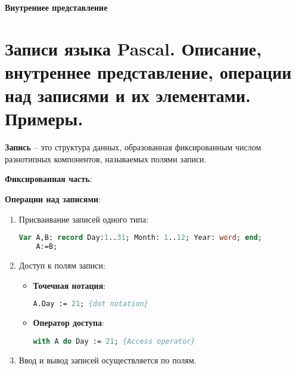{\bf{Внутреннее представление}}







\newpage\section{Записи языка Pascal. Описание, внутреннее представление, операции над записями и их 
элементами. Примеры. }

\begin{myquote}
            
\end{myquote}

{\bf{Запись}} – это структура данных, образованная фиксированным числом разнотипных компонентов, называемых полями записи.


{\bf{Фиксированная часть}}:


{\bf{Операции над записями}}:

\begin{enumerate}
\item Присваивание записей одного типа:

\begin{lstlisting}[language=Pascal]
	Var A,B: record Day:1..31; Month: 1..12; Year: word; end;
	A:=B;
\end{lstlisting}

\item Доступ к полям записи:
\begin{itemize}

\item {\bf{Точечная нотация}}:


\begin{lstlisting}[language=Pascal]
    A.Day := 21; {dot notation}
\end{lstlisting}

\item {\bf{Оператор доступа}}:


\begin{lstlisting}[language=Pascal]
    with A do Day := 21; {Access operator}
\end{lstlisting}

\end{itemize}

\item Ввод и вывод записей осуществляется по полям.

\end{enumerate}
    
